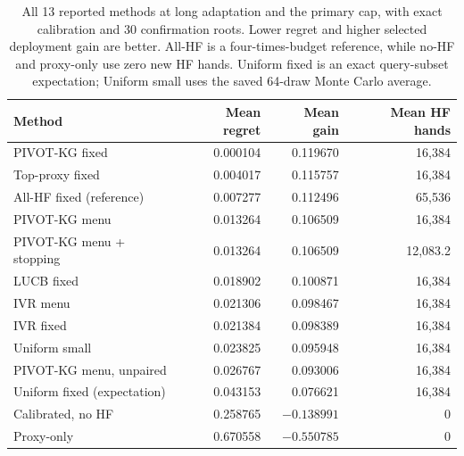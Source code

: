 \begin{table}[t]
\centering
\caption{All 13 reported methods at long adaptation and the primary cap, with exact calibration and 30 confirmation roots. Lower regret and higher selected deployment gain are better. All-HF is a four-times-budget reference, while no-HF and proxy-only use zero new HF hands. Uniform fixed is an exact query-subset expectation; Uniform small uses the saved 64-draw Monte Carlo average.}
\label{add20260923:leduc:methods}
\small
\begin{tabular}{lrrr}
\hline
Method & Mean regret & Mean gain & Mean HF hands \\
\hline
PIVOT-KG fixed & 0.000104 & 0.119670 & 16,384 \\
Top-proxy fixed & 0.004017 & 0.115757 & 16,384 \\
All-HF fixed (reference) & 0.007277 & 0.112496 & 65,536 \\
PIVOT-KG menu & 0.013264 & 0.106509 & 16,384 \\
PIVOT-KG menu + stopping & 0.013264 & 0.106509 & 12,083.2 \\
LUCB fixed & 0.018902 & 0.100871 & 16,384 \\
IVR menu & 0.021306 & 0.098467 & 16,384 \\
IVR fixed & 0.021384 & 0.098389 & 16,384 \\
Uniform small & 0.023825 & 0.095948 & 16,384 \\
PIVOT-KG menu, unpaired & 0.026767 & 0.093006 & 16,384 \\
Uniform fixed (expectation) & 0.043153 & 0.076621 & 16,384 \\
Calibrated, no HF & 0.258765 & $-0.138991$ & 0 \\
Proxy-only & 0.670558 & $-0.550785$ & 0 \\
\hline
\end{tabular}
\end{table}
